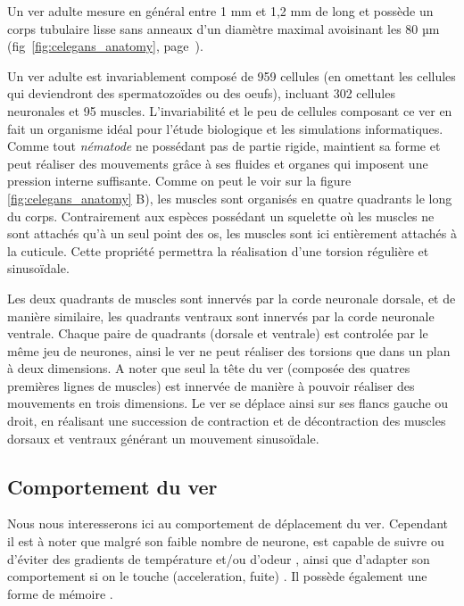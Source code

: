 Un ver \celeg{} adulte mesure en général entre 1 mm et 1,2 mm de long et
possède un corps tubulaire lisse sans anneaux d'un diamètre maximal
avoisinant les 80 µm (fig~\ref{fig:celegans_anatomy},
page~\pageref{fig:celegans_anatomy}).

Un ver adulte est invariablement composé de 959 cellules (en omettant les
cellules qui deviendront des spermatozoïdes ou des oeufs), incluant 302
cellules neuronales et 95 muscles.  \cite{Boyle2009} L'invariabilité et le peu de
cellules composant ce ver en fait un organisme idéal pour l'étude
biologique et les simulations informatiques.\\


Comme tout \textit{nématode} ne possédant pas de partie rigide, \celeg{}
maintient sa forme et peut réaliser des mouvements grâce à ses fluides et
organes qui imposent une pression interne suffisante. Comme on peut le voir sur
la figure \ref{fig:celegans_anatomy} B), les muscles sont organisés en quatre
quadrants le long du corps. Contrairement aux espèces possédant un squelette où
les muscles ne sont attachés qu'à un seul point des os, les muscles sont ici
entièrement attachés à la cuticule. Cette propriété permettra la réalisation
d'une torsion régulière et sinusoïdale.

Les deux quadrants de muscles sont innervés par la corde neuronale dorsale, et
de manière similaire, les quadrants ventraux sont innervés par la corde
neuronale ventrale. Chaque paire de quadrants (dorsale et ventrale) est
controlée par le même jeu de neurones, ainsi le ver ne peut réaliser des
torsions que dans un plan à deux dimensions. A noter que seul la tête du ver
(composée des quatres premières lignes de muscles) est innervée de manière à
pouvoir réaliser des mouvements en trois dimensions. Le ver se déplace ainsi
sur ses flancs gauche ou droit, en réalisant une succession de contraction et
de décontraction des muscles dorsaux et ventraux générant un mouvement
sinusoïdale.


\subsection{Comportement du ver} %
\label{sub:Comportement du ver}

Nous nous interesserons ici au comportement de déplacement du ver. Cependant il est
à noter que malgré son faible nombre de neurone, \celeg{} est capable de
suivre ou d'éviter des gradients de température et/ou d'odeur
\cite{Ferree1999,Gray2005}, ainsi que d'adapter son comportement si on le touche
(acceleration, fuite) \cite{Chalfie1985}. Il possède également une forme de
mémoire \cite{Rankin2005a}.\\

